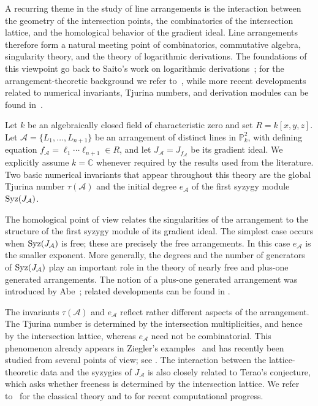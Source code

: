\documentclass[11pt]{amsart}   %
\theoremstyle{definition}
\def\syz{\mbox{\rm Syz}}
\def\NZQ{\mathbb}               %
\def\CC{{\NZQ C}}
\def\PP{{\NZQ P}}
\def\A{{\mathcal A}}
\begin{document}
A recurring theme in the study of line arrangements is the interaction
between the geometry of the intersection points, the combinatorics of
the intersection lattice, and the homological behavior of the gradient
ideal. Line arrangements therefore form a natural meeting point of
combinatorics, commutative algebra, singularity theory, and the theory
of logarithmic derivations. The foundations of this viewpoint go back
to Saito's work on logarithmic derivations~\cite{SaitoLogarithmic}; for the arrangement-theoretic background we
refer to~\cite{Orlik-Terao}, while more recent developments related to
numerical invariants, Tjurina numbers, and derivation modules can be found in~\cite{Dimca-minimal-Tjurina, Dimca-local-derivations, Dimca-Ibadula-Macinic}.

Let $k$ be an algebraically closed field of characteristic zero and set
$R=k[x,y,z]$. Let $\A=\{L_1,\ldots,L_{n+1}\}$ be an arrangement of distinct lines in $\PP_k^2$, with defining equation
$f_\A=\ell_1\cdots\ell_{n+1}\in R$, and let $J_\A=J_{f_\A}$ be its
gradient ideal. We explicitly assume $k=\CC$ whenever required by the
results used from the literature. Two basic numerical invariants that appear throughout
this theory are the global Tjurina number $\tau(\A)$ and the initial
degree $e_\A$ of the first syzygy module $\syz(J_\A)$.

The homological point of view relates the singularities of the
arrangement to the structure of the first syzygy module of its
gradient ideal. The simplest case occurs when $\syz(J_\A)$ is free;
these are precisely the free arrangements. In this case $e_\A$ is the
smaller exponent. More generally, the degrees and the number of
generators of $\syz(J_\A)$ play an important role in the theory of
nearly free and plus-one generated arrangements. The notion of a
plus-one generated arrangement was introduced by Abe~\cite{Abe-plus-one}; related developments can be found in
\cite{Abe-Dimca-Pokora-hierarchy,
Bromboszcz-plus-one,Dimca-Ibadula-Macinic, Dimca-Kuhne-Pokora}.

The invariants $\tau(\A)$ and $e_\A$ reflect rather different aspects
of the arrangement. The Tjurina number is determined by the
intersection multiplicities, and hence by the intersection lattice,
whereas $e_\A$ need not be combinatorial. This phenomenon already
appears in Ziegler's examples~\cite{Ziegler1989} and has recently been
studied from several points of view; see
\cite{Dimca-Pokora-Jacobian-Ziegler,Dimca-Pokora-nine, Dimca-Pokora-Ziegler, DiPasquale-Sidman-Traves, Kuhne-Luber-Pokora}. The interaction between the lattice-theoretic
data and the syzygies of $J_\A$ is also closely related to Terao's
conjecture, which asks whether freeness is determined by the
intersection lattice. We refer to~\cite{Orlik-Terao} for the classical
theory and to \cite{Barakat-Kuhne} for recent computational progress.
\end{document}
